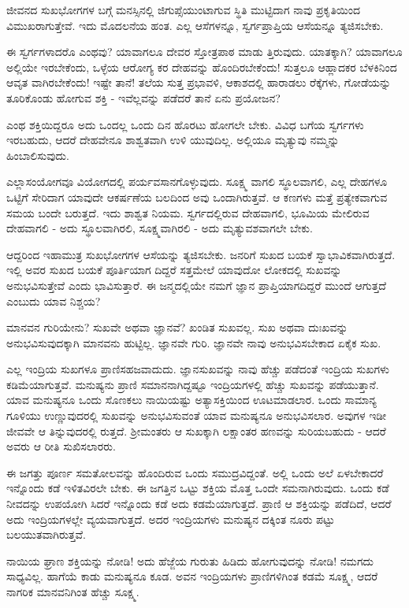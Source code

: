 ಜೀವನದ ಸುಖಭೋಗಗಳ ಬಗ್ಗೆ ಮನಸ್ಸಿನಲ್ಲಿ ಜಿಗುಪ್ಸೆಯುಂಟಾಗುವ ಸ್ಥಿತಿ ಮುಟ್ಟಿದಾಗ ನಾವು ಪ್ರಕೃತಿಯಿಂದ ವಿಮುಖರಾಗುತ್ತೇವೆ. ಇದು ಮೊದಲನೆಯ ಹಂತ. ಎಲ್ಲ ಆಸೆಗಳನ್ನೂ, ಸ್ವರ್ಗಪ್ರಾಪ್ತಿಯ ಆಸೆಯನ್ನೂ ತ್ಯಜಿಸಬೇಕು.

ಈ ಸ್ವರ್ಗಗಳಾದರೊ ಎಂಥವು? ಯಾವಾಗಲೂ ದೇವರ ಸ್ತೋತ್ರಪಾಠ ಮಾಡು ತ್ತಿರುವುದು. ಯಾತಕ್ಕಾಗಿ? ಯಾವಾಗಲೂ ಅಲ್ಲಿಯೇ ಇರಬೇಕೆಂದು, ಒಳ್ಳೆಯ ಆರೋಗ್ಯ ಕರ ದೇಹವನ್ನು ಹೊಂದಿರಬೇಕೆಂದು! ಸುತ್ತಲೂ ಆಹ್ಲಾದಕರ ಬೆಳಕಿನಿಂದ ಆವೃತ ವಾಗಿರಬೇಕೆಂದು! ಇಷ್ಟೇ ತಾನೆ! ತಲೆಯ ಸುತ್ತ ಪ್ರಭಾವಳಿ, ಆಕಾಶದಲ್ಲಿ ಹಾರಾಡಲು ರೆಕ್ಕೆಗಳು, ಗೋಡೆಯನ್ನು ತೂರಿಕೊಂಡು ಹೋಗುವ ಶಕ್ತಿ - ಇವೆಲ್ಲವನ್ನು ಪಡೆದರೆ ತಾನೆ ಏನು ಪ್ರಯೋಜನ?

ಎಂಥ ಶಕ್ತಿಯಿದ್ದರೂ ಅದು ಒಂದಲ್ಲ ಒಂದು ದಿನ ಹೊರಟು ಹೋಗಲೇ ಬೇಕು. ವಿವಿಧ ಬಗೆಯ ಸ್ವರ್ಗಗಳು ಇರಬಹುದು, ಆದರೆ ದೇಹವೇನೂ ಶಾಶ್ವತವಾಗಿ ಉಳಿ ಯುವುದಿಲ್ಲ. ಅಲ್ಲಿಯೂ ಮೃತ್ಯುವು ನಮ್ಮನ್ನು ಹಿಂಬಾಲಿಸುವುದು.

ಎಲ್ಲಾಸಂಯೋಗವೂ ವಿಯೋಗದಲ್ಲಿ ಪರ್ಯವಸಾನಗೊಳ್ಳುವುದು. ಸೂಕ್ಷ್ಮ ವಾಗಲಿ ಸ್ಥೂಲವಾಗಲಿ, ಎಲ್ಲ ದೇಹಗಳೂ ಒಟ್ಟಿಗೆ ಸೇರಿದಾಗ ಯಾವುದೇ ಆಕರ್ಷಣೆಯ ಬಲದಿಂದ ಅವು ಒಂದಾಗಿರುತ್ತವೆ. ಆ ಕಣಗಳು ಮತ್ತೆ ಪ್ರತ್ಯೇಕವಾಗುವ ಸಮಯ ಬಂದೇ ಬರುತ್ತದೆ. ಇದು ಶಾಶ್ವತ ನಿಯಮ. ಸ್ವರ್ಗದಲ್ಲಿರುವ ದೇಹವಾಗಲಿ, ಭೂಮಿಯ ಮೇಲಿರುವ ದೇಹವಾಗಲಿ - ಅದು ಸ್ಥೂಲವಾಗಿರಲಿ, ಸೂಕ್ಷ್ಮವಾಗಿರಲಿ - ಅದು ಮೃತ್ಯುವಶವಾಗಲೇ ಬೇಕು.

ಆದ್ದರಿಂದ ಇಹಾಮುತ್ರ ಸುಖಭೋಗಗಳ ಆಸೆಯನ್ನು ತ್ಯಜಿಸಬೇಕು. ಜನರಿಗೆ ಸುಖದ ಬಯಕೆ ಸ್ವಾಭಾವಿಕವಾಗಿರುತ್ತದೆ. ಇಲ್ಲಿ ಅವರ ಸುಖದ ಬಯಕೆ ಪೂರ್ತಿಯಾಗ ದಿದ್ದರೆ ಸತ್ತಮೇಲೆ ಯಾವುದೋ ಲೋಕದಲ್ಲಿ ಸುಖವನ್ನು ಅನುಭವಿಸುತ್ತೇವೆ ಎಂದು ಭಾವಿಸುತ್ತಾರೆ. ಈ ಜನ್ಮದಲ್ಲಿಯೇ ನಮಗೆ ಜ್ಞಾನ ಪ್ರಾಪ್ತಿಯಾಗದಿದ್ದರೆ ಮುಂದೆ ಆಗುತ್ತದೆ ಎಂಬುದು ಯಾವ ನಿಶ್ಚಯ?

ಮಾನವನ ಗುರಿಯೇನು? ಸುಖವೇ ಅಥವಾ ಜ್ಞಾನವೆ? ಖಂಡಿತ ಸುಖವಲ್ಲ. ಸುಖ ಅಥವಾ ದುಃಖವನ್ನು ಅನುಭವಿಸುವುದಕ್ಕಾಗಿ ಮಾನವನು ಹುಟ್ಟಿಲ್ಲ. ಜ್ಞಾನವೇ ಗುರಿ. ಜ್ಞಾನವೇ ನಾವು ಅನುಭವಿಸಬೇಕಾದ ಏಕೈಕ ಸುಖ.

ಎಲ್ಲ ಇಂದ್ರಿಯ ಸುಖಗಳೂ ಪ್ರಾಣಿಸಹಜವಾದುದು. ಜ್ಞಾನಸುಖವನ್ನು ನಾವು ಹೆಚ್ಚು ಪಡೆದಂತೆ ಇಂದ್ರಿಯ ಸುಖಗಳು ಕಡಿಮೆಯಾಗುತ್ತವೆ. ಮನುಷ್ಯನು ಪ್ರಾಣಿ ಸಮಾನನಾಗಿದ್ದಷ್ಟೂ ಇಂದ್ರಿಯಗಳಲ್ಲಿ ಹೆಚ್ಚು ಸುಖವನ್ನು ಪಡೆಯುತ್ತಾನೆ. ಯಾವ ಮನುಷ್ಯನೂ ಒಂದು ಸೊಣಕಲು ನಾಯಿಯಷ್ಟು ಅತ್ಯಾಸಕ್ತಿಯಿಂದ ಊಟಮಾಡಲಾರ. ಒಂದು ಸಾಮಾನ್ಯ ಗೂಳಿಯು ಉಣ್ಣುವುದರಲ್ಲಿ ಸುಖವನ್ನು ಅನುಭವಿಸುವಂತೆ ಯಾವ ಮನುಷ್ಯನೂ ಅನುಭವಿಸಲಾರ. ಅವುಗಳ ಇಡೀ ಜೀವವೇ ಆ ತಿನ್ನುವುದರಲ್ಲಿ ರುತ್ತದೆ. ಶ‍್ರೀಮಂತರು ಆ ಸುಖಕ್ಕಾಗಿ ಲಕ್ಷಾಂತರ ಹಣವನ್ನು ಸುರಿಯಬಹುದು - ಆದರೆ ಅವರು ಆ ರೀತಿ ಸುಖಿಸಲಾರರು.

ಈ ಜಗತ್ತು ಪೂರ್ಣ ಸಮತೋಲವನ್ನು ಹೊಂದಿರುವ ಒಂದು ಸಮುದ್ರವಿದ್ದಂತೆ. ಅಲ್ಲಿ ಒಂದು ಅಲೆ ಏಳಬೇಕಾದರೆ ಇನ್ನೊಂದು ಕಡೆ ಇಳಿತವಿರಲೇ ಬೇಕು. ಈ ಜಗತ್ತಿನ ಒಟ್ಟು ಶಕ್ತಿಯ ಮೊತ್ತ ಒಂದೇ ಸಮನಾಗಿರುವುದು. ಒಂದು ಕಡೆ ನೀವದನ್ನು ಉಪಯೋಗಿ ಸಿದರೆ ಇನ್ನೊಂದು ಕಡೆ ಅದು ಕಡಮೆಯಾಗುತ್ತದೆ. ಪ್ರಾಣಿ ಆ ಶಕ್ತಿಯನ್ನು ಪಡೆದಿದೆ, ಆದರೆ ಅದು ಇಂದ್ರಿಯಗಳಲ್ಲೇ ವ್ಯಯವಾಗುತ್ತದೆ. ಅದರ ಇಂದ್ರಿಯಗಳು ಮನುಷ್ಯನ ದಕ್ಕಿಂತ ನೂರು ಪಟ್ಟು ಬಲಯುತವಾಗಿರುತ್ತವೆ.

ನಾಯಿಯ ಘ್ರಾಣ ಶಕ್ತಿಯನ್ನು ನೋಡಿ! ಅದು ಹೆಜ್ಜೆಯ ಗುರುತು ಹಿಡಿದು ಹೋಗುವುದನ್ನು ನೋಡಿ! ನಮಗದು ಸಾಧ್ಯವಿಲ್ಲ. ಹಾಗೆಯೆ ಕಾಡು ಮನುಷ್ಯನೂ ಕೂಡ. ಅವನ ಇಂದ್ರಿಯಗಳು ಪ್ರಾಣಿಗಳಿಗಿಂತ ಕಡಮೆ ಸೂಕ್ಷ್ಮ, ಆದರೆ ನಾಗರಿಕ ಮಾನವನಿಗಿಂತ ಹೆಚ್ಚು ಸೂಕ್ಷ್ಮ.

